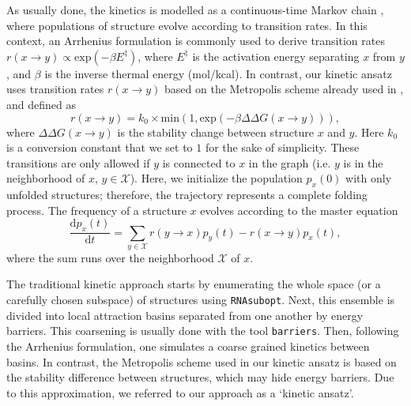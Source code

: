 As usually done, the kinetics is modelled as a continuous-time Markov chain \cite{lorenz20_effic_comput_base_probab_multi_rna_foldin}, where populations of structure evolve according to transition rates. In this context, an Arrhenius formulation is commonly used to derive transition rates \(r(x \rightarrow y) \propto \text{exp}(-\beta E^{\ddagger})\), where \(E^{\ddagger}\) is the activation energy separating \(x\) from \(y\), and \(\beta\) is the inverse thermal energy (mol/kcal). In contrast, our kinetic ansatz uses transition rates \(r(x\rightarrow y)\) based on the Metropolis scheme already used in \cite{klemm2008funnels}, and defined as
\begin{equation}
\label{Eq:metropolis}
r(x\rightarrow y) = k_0 \times \text{min}(1, \text{exp}(-\beta \Delta \Delta G(x\rightarrow y))),
\end{equation}
where \(\Delta \Delta G(x\rightarrow y)\) is the stability change between structure \(x\) and \(y\). Here \(k_0\) is a conversion constant that we set to $1$ for the sake of simplicity.  These transitions are only allowed if \(y\) is connected to \(x\) in the graph (i.e. \(y\) is in the neighborhood of \(x\), \(y \in \mathcal{X}\)). Here, we initialize the population \(p_x(0)\) with only unfolded structures; therefore, the trajectory represents a complete folding process. The frequency of a structure \(x\) evolves according to the master equation
\begin{equation}
\label{Eq:kenetics}
\frac{\text{d}p_x(t)}{\text{d}t} = \sum\limits_{y \in \mathcal{X}}
r(y \rightarrow x) p_{y}(t) - r(x \rightarrow y) p_{x}(t),
\end{equation}
where the sum runs over the neighborhood \(\mathcal{X}\) of \(x\).

The traditional kinetic approach starts by enumerating the whole space (or a carefully chosen subspace) of structures using \texttt{RNAsubopt}. Next, this ensemble is divided into local attraction basins separated from one another by energy barriers. This coarsening is usually done with the tool \texttt{barriers}. Then, following the Arrhenius formulation, one simulates a coarse grained kinetics between basins. In contrast, the Metropolis scheme used in our kinetic ansatz is based on the stability difference between structures, which may hide energy barriers. Due to this approximation, we referred to our approach as a `kinetic ansatz'.

